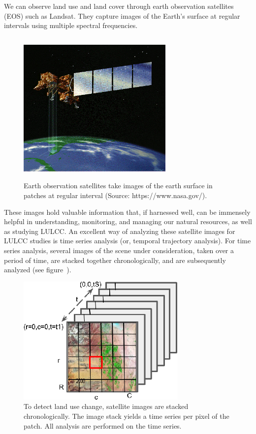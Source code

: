 \documentclass[a4paper,11pt]{article}
\begin{document}
We can observe land use and land cover through earth observation satellites (EOS) such as Landsat.
They capture images of the
Earth's surface at regular intervals using multiple spectral frequencies.
\begin{figure}
\centering
\includegraphics[width=3.00in, height=3.00in]{./landsat.png}
\caption{Earth observation satellites take images of the earth surface in patches at regular interval (Source: https://www.nasa.gov/).}
\end{figure}
These images hold valuable information that, if harnessed well, can be 
immensely helpful in understanding, monitoring, and managing our natural 
resources, as well as studying LULCC.
An excellent way of analyzing these satellite images for LULCC studies is
time series  analysis (or, temporal trajectory analysis). 
For time series analysis, several 
images of the scene under consideration, taken over a period of time, are
stacked together chronologically, and are subsequently analyzed (see figure~\cite{fig:stack}).
\begin{figure}
\centering
\includegraphics{./image_stack.png}
\caption{To detect land use change, satellite images are stacked chronologically.
The image stack yields a time series per pixel of the patch. All analysis are performed
on the time series.\label{fig:stack}}
\end{figure}
\end{document}
